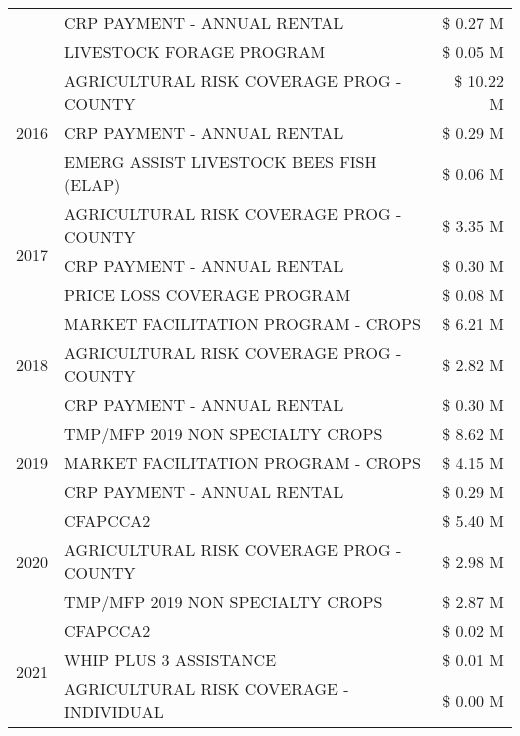 \begin{tabular}{llr}
 & CRP PAYMENT - ANNUAL RENTAL & \$ 0.27 M \\
 & LIVESTOCK FORAGE PROGRAM & \$ 0.05 M \\
\cline{1-3}
\multirow[t]{3}{*}{2016} & AGRICULTURAL RISK COVERAGE PROG - COUNTY      & \$ 10.22 M \\
 & CRP PAYMENT - ANNUAL RENTAL                   & \$ 0.29 M \\
 & EMERG ASSIST LIVESTOCK BEES FISH (ELAP)       & \$ 0.06 M \\
\cline{1-3}
\multirow[t]{3}{*}{2017} & AGRICULTURAL RISK COVERAGE PROG - COUNTY & \$ 3.35 M \\
 & CRP PAYMENT - ANNUAL RENTAL & \$ 0.30 M \\
 & PRICE LOSS COVERAGE PROGRAM & \$ 0.08 M \\
\cline{1-3}
\multirow[t]{3}{*}{2018} & MARKET FACILITATION PROGRAM - CROPS & \$ 6.21 M \\
 & AGRICULTURAL RISK COVERAGE PROG - COUNTY & \$ 2.82 M \\
 & CRP PAYMENT - ANNUAL RENTAL & \$ 0.30 M \\
\cline{1-3}
\multirow[t]{3}{*}{2019} & TMP/MFP 2019 NON SPECIALTY CROPS & \$ 8.62 M \\
 & MARKET FACILITATION PROGRAM - CROPS & \$ 4.15 M \\
 & CRP PAYMENT - ANNUAL RENTAL & \$ 0.29 M \\
\cline{1-3}
\multirow[t]{3}{*}{2020} & CFAPCCA2 & \$ 5.40 M \\
 & AGRICULTURAL RISK COVERAGE PROG - COUNTY & \$ 2.98 M \\
 & TMP/MFP 2019 NON SPECIALTY CROPS & \$ 2.87 M \\
\cline{1-3}
\multirow[t]{3}{*}{2021} & CFAPCCA2 & \$ 0.02 M \\
 & WHIP PLUS 3 ASSISTANCE & \$ 0.01 M \\
 & AGRICULTURAL RISK COVERAGE - INDIVIDUAL & \$ 0.00 M \\
\cline{1-3}
\bottomrule
\end{tabular}

